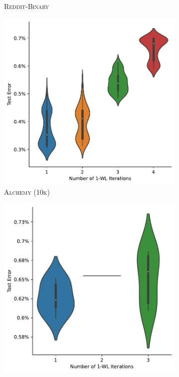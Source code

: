 \begin{figure}
\begin{subfigure}[b]{0.19\textwidth}
        \caption{\scriptsize \textsc{Reddit-Binary}}
	\end{subfigure}
	\hfill
	\begin{subfigure}[b]{0.19\textwidth}
		\centering
		\includegraphics[width=\textwidth]{Figures/k_wl_violin_Alchemy10K.pdf}
        \caption{\scriptsize\textsc{Alchemy (10k)}}
	\end{subfigure}
	\hfill
	\begin{subfigure}[b]{0.19\textwidth}
		\centering
		\includegraphics[width=\textwidth]{Figures/k_wl_violin_Alchemy.pdf}

\end{subfigure}
\end{figure}
